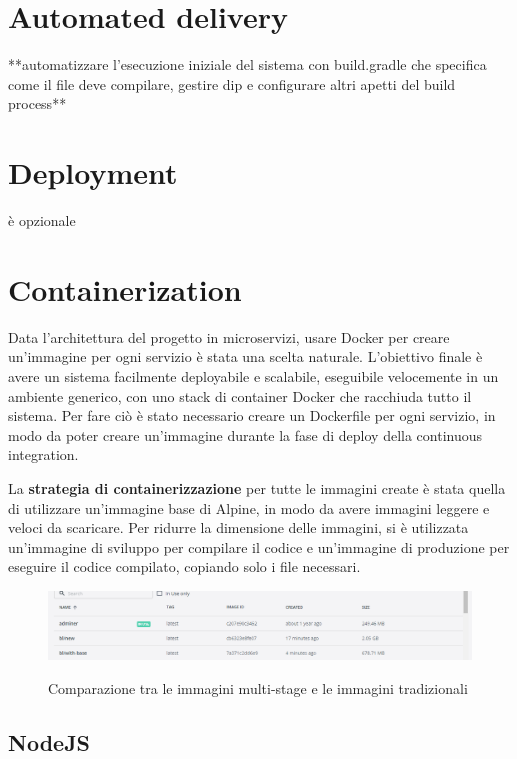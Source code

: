 \section{Automated delivery}
**automatizzare l'esecuzione iniziale del sistema con build.gradle che specifica come
il file deve compilare, gestire dip e configurare altri apetti del build process**
\section{Deployment}
è opzionale
\section{Containerization}

Data l'architettura del progetto in microservizi, usare Docker per creare un'immagine per ogni servizio è stata una scelta naturale. 
L'obiettivo finale è avere un sistema facilmente deployabile e scalabile, eseguibile velocemente in un ambiente generico, con uno stack di container Docker che racchiuda tutto il sistema.
Per fare ciò è stato necessario creare un Dockerfile per ogni servizio, in modo da poter creare un'immagine durante la fase di deploy della continuous integration.
\vspace{1cm}

La \textbf{strategia di containerizzazione} per tutte le immagini create è stata quella di utilizzare un'immagine base di Alpine, in modo da avere immagini leggere e veloci da scaricare. Per ridurre la dimensione delle immagini,
si è utilizzata un'immagine di sviluppo per compilare il codice e un'immagine di produzione per eseguire il codice compilato, copiando solo i file necessari.

\begin{figure}[H]
\caption{Comparazione tra le immagini multi-stage e le immagini tradizionali}
\centering
\includegraphics[width=12cm]{report/img/multi_stage.png}\\[10.5cm]
\end{figure}

\subsection{NodeJS}

